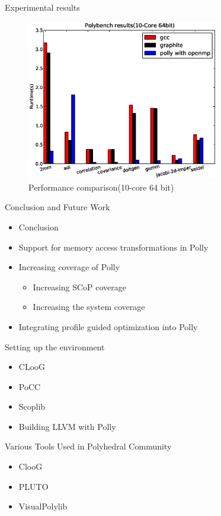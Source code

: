 \documentclass{beamer}
\begin{document}
\begin{frame}{Experimental results}
\begin{figure}
\begin{center}
  \includegraphics[height=7cm]{images/10core64bit.eps}
  \caption{Performance comparison(10-core 64 bit)}
  \label{fig:10core}
\end{center}
\end{figure}
\end{frame}

\begin{frame}{Conclusion and Future Work}
\begin{itemize}
\item Conclusion
\item Support for memory access transformations in Polly
\item Increasing coverage of Polly
	\begin{itemize}
	\item Increasing SCoP coverage
	\item Increasing the system coverage
	\end{itemize}
\item Integrating profile guided optimization into Polly
\end{itemize}
\end{frame}

\begin{frame}{Setting up the environment}
\begin{itemize}
\item CLooG
\item PoCC
\item Scoplib
\item Building LLVM with Polly
\end{itemize}
\end{frame}

\begin{frame}{Various Tools Used in Polyhedral Community}
\begin{itemize}
\item ClooG
\item PLUTO
\item VisualPolylib
\end{itemize}
\end{frame}
\end{document}
